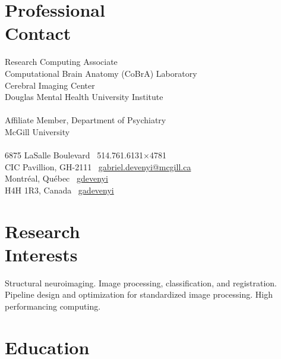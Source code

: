 \documentclass[margin1,line,canadian]{resume}
\begin{document}
\begin{resume}
 \section{\mysidestyle Professional\\Contact}
 Research Computing Associate\\
 Computational Brain Anatomy (CoBrA) Laboratory\\
 Cerebral Imaging Center\\
 Douglas Mental Health University Institute\\
 \\
 Affiliate Member, Department of Psychiatry\\
 McGill University\\
 \\
 6875 LaSalle Boulevard \hfill \faPhone~514.761.6131$\times$4781\\
 CIC Pavillion, GH-2111 \hfill \faEnvelope~\href{mailto:gabriel.devenyi@mcgill.ca}{gabriel.devenyi@mcgill.ca}\\
 Montr\'{e}al, Qu\'{e}bec \hfill \faGithub~\href{https://github.com/gdevenyi}{gdevenyi}\\
 H4H 1R3, Canada \hfill \faTwitter~\href{https://twitter.com/gadevenyi}{gadevenyi}\\
 \vspace{-4.5mm}%

 \section{\mysidestyle Research\\Interests}

 Structural neuroimaging. Image processing, classification, and registration. Pipeline design and optimization
 for standardized image processing. High performancing computing.

 \section{\mysidestyle Education}


\end{resume}
\end{document}

